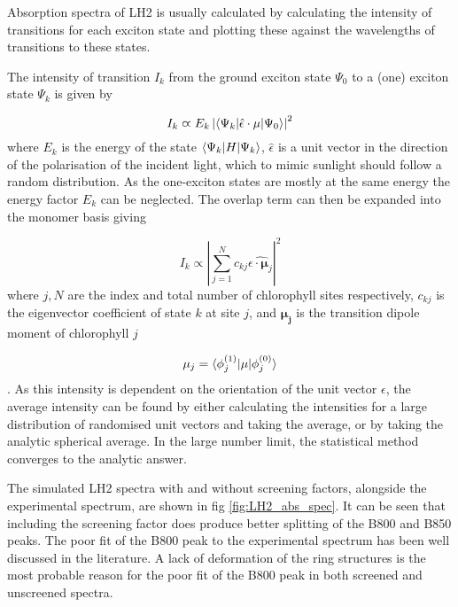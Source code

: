 Absorption spectra of LH2 is usually calculated by calculating the intensity of 
transitions for each exciton state and plotting these against the wavelengths of
transitions to these states. 

The intensity of transition $I_k$ from the ground exciton state $\Psi_0$ to a (one)
exciton state $\Psi_k$ is given by

\begin{equation}
    I_k \varpropto E_k \left\lvert \braket{\Psi_k| \hat{\epsilon} \cdot \mathbf{\mu} | \Psi_0} \right\rvert^2
\end{equation}
%
where $E_k$ is the energy of the state $\braket{\Psi_k|H|\Psi_k}$, $\hat{\epsilon}$
is a unit vector in the direction of the polarisation of the incident light, which
to mimic sunlight should follow a random distribution. As the one-exciton states 
are mostly at the same energy the energy factor $E_k$ can be neglected. The overlap
term can then be expanded into the monomer basis giving

\begin{equation}
    I_k \varpropto \left\lvert \sum^N_{j=1} c_{kj} \hat{\epsilon \cdot \mathbf{\mu}_j }\right\rvert^2
\end{equation}
%
where $j,N$ are the index and total number of chlorophyll sites respectively, $c_{kj}$
is the eigenvector coefficient of state $k$ at site $j$, and $\mathbf{\mu_j}$ is 
the transition dipole moment of chlorophyll $j$ 

\begin{equation}
    \mathbf{\mu}_j = \braket{\phi_j^{\left(1\right)}|\mathbf{\mu}|\phi_j^{\left(0\right)}}
\end{equation}
%
. As this intensity is dependent on the orientation of the unit vector $\epsilon$,
the average intensity can be found by either calculating the intensities for a large
distribution of randomised unit vectors and taking the average, or by taking the
analytic spherical average. In the large number limit, the statistical method converges
to the analytic answer.

The simulated LH2 spectra with and without screening factors, alongside the experimental 
spectrum, are shown in fig \ref{fig:LH2_abs_spec}. It can be seen that including
the screening factor does produce better splitting of the B800 and B850 peaks. The
poor fit of the B800 peak to the experimental spectrum has been well discussed in
the literature. A lack of deformation of the ring structures is the most probable
reason for the poor fit of the B800 peak in both screened and unscreened spectra.


